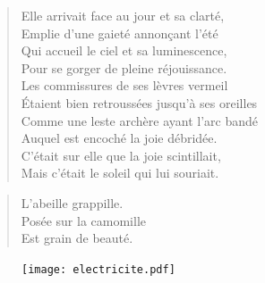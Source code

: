\begin{verse}\dizain
  Elle arrivait face au jour et sa clarté,\\  %
  Emplie d’une gaieté annonçant l’été\\  %
  Qui accueil le ciel et sa luminescence,\\  %
  Pour se gorger de pleine réjouissance.\\  %
  Les commissures de ses lèvres vermeil\\  %
  Étaient bien retroussées jusqu’à ses oreilles\\  %
  Comme une leste archère ayant l’arc bandé\\  %
  Auquel est encoché la joie débridée.\\  %
  C’était sur elle que la joie scintillait,\\  %
  Mais c’était le soleil qui lui souriait.
\end{verse}

\begin{verse}\haiku
  L’abeille grappille.\\  %
  Posée sur la camomille\\  %
  Est grain de beauté.
\end{verse}

\begin{figure}[h]
  \centering
  \texttt{[image: electricite.pdf]}
  \captionsetup{labelformat=empty}
  \caption[Idéotexte de l’]{}
\end{figure}

